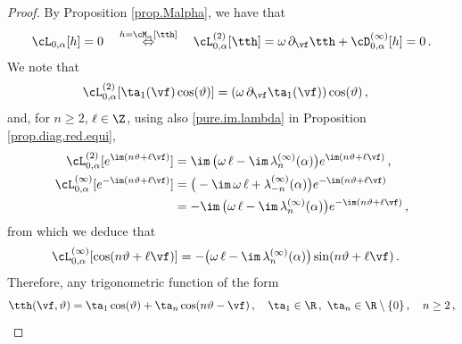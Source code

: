 \documentclass[a4paper,reqno,10pt]{article}
\newcommand{\pa}{\partial}
\begin{document}
\begin{proof}
    By Proposition \ref{prop.Malpha}, we have that
    \begin{equation}
	\cL_{0,\alpha}[h] = 0 \quad \stackrel{h = \cM_{\alpha}[\tth]}{\Leftrightarrow} \quad \cL_{0,\alpha}^{(2)} [\tth]  = \omega\,\pa_{\vf}\tth + \cD_{0,\alpha}^{(\infty)}[h] = 0 \,.
\end{equation}
We note that
\begin{equation}
	\begin{aligned}
			\cL_{0,\alpha}^{(2)}[\ta_{1}(\vf)\cos(\vartheta)] & =  (\omega\,\pa_{\vf}\ta_{1}(\vf)) \cos(\vartheta) \,, 
	\end{aligned}
\end{equation}
and, for $n\geq 2$, $\ell \in\Z$, using also \eqref{pure.im.lambda} in Proposition \ref{prop.diag.red.equi},
\begin{equation}
	\begin{aligned}
		\cL_{0,\alpha}^{(2)}[e^{\im(n\vartheta+\ell\vf)}] & = \im \,\big( \omega\,\ell -\im\,\lambda_{n}^{(\infty)}(\alpha) \big) e^{\im(n\vartheta+\ell\vf)} \,, \\
		\cL_{0,\alpha}^{(\infty)}[e^{-\im(n\vartheta+\ell\vf)}] & = \big( -\im\,\omega\,\ell + \lambda_{-n}^{(\infty)}(\alpha) \big)e^{-\im(n\vartheta+\ell\vf)} \\
		& = -\im \, \big( \omega\,\ell -\im\,\lambda_{n}^{(\infty)}(\alpha) \big) e^{-\im(n\vartheta+\ell\vf)}\,,
	\end{aligned}
\end{equation}
from which we deduce that
\begin{equation}
	\begin{aligned}
		\cL_{0,\alpha}^{(\infty)}[\cos(n\vartheta+\ell\vf)] & = - \big( \omega\,\ell -\im\,\lambda_{n}^{(\infty)}(\alpha) \big) \sin(n\vartheta+\ell\vf) \,.
	\end{aligned}
\end{equation}
Therefore, any trigonometric function of the form
\begin{equation}
	\tth(\vf,\vartheta) = \ta_{1} \cos(\vartheta) + \ta_{n} \cos(n\vartheta - \vf) \,, \quad \ta_{1}\in\R\,, \ \ta_{n}\in\R\setminus\{0\}\,, \quad n\geq 2\,,

\end{equation}
\end{proof}
\end{document}
